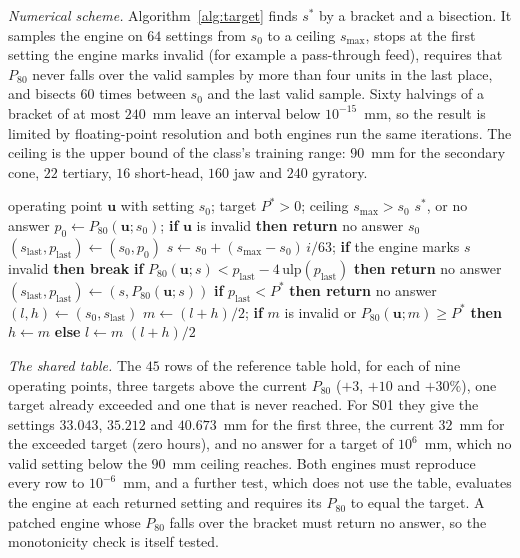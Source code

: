 \emph{Numerical scheme.} Algorithm~\ref{alg:target} finds $s^{\ast}$ by a bracket and a bisection. It samples the engine on $64$ settings from $s_0$
to a ceiling $s_{\max}$, stops at the first setting the engine marks invalid (for example a pass-through feed), requires that $P_{80}$ never falls
over the valid samples by more than four units in the last place, and bisects $60$ times between $s_0$ and the last valid sample. Sixty halvings of a
bracket of at most $240$~mm leave an interval below $10^{-15}$~mm, so the result is limited by floating-point resolution and both engines run the
same iterations. The ceiling is the upper bound of the class's training range: $90$~mm for the secondary cone, $22$ tertiary, $16$ short-head, $160$
jaw and $240$ gyratory.

\begin{algorithm}[!t]
\caption{The setting at which the engine's $P_{80}$ reaches a target (\texttt{css\_at\_p80\_target}).}
\label{alg:target}
\begin{algorithmic}[1]
\Require operating point $\mathbf u$ with setting $s_0$; target $P^{\ast}>0$; ceiling $s_{\max}>s_0$
\Ensure $s^{\ast}$, or no answer
\State $p_0\gets P_{80}(\mathbf u;s_0)$; \textbf{if} $\mathbf u$ is invalid \textbf{then return} no answer
 \Return $s_0$ 
\EndIf
\State $(s_{\mathrm{last}}, p_{\mathrm{last}})\gets(s_0,p_0)$
  \State $s\gets s_0+(s_{\max}-s_0)\,i/63$; \textbf{if} the engine marks $s$ invalid \textbf{then break}
  \State \textbf{if} $P_{80}(\mathbf u;s)<p_{\mathrm{last}}-4\,\mathrm{ulp}(p_{\mathrm{last}})$ \textbf{then return} no answer 
  \State $(s_{\mathrm{last}}, p_{\mathrm{last}})\gets(s, P_{80}(\mathbf u;s))$
\EndFor
\State \textbf{if} $p_{\mathrm{last}}<P^{\ast}$ \textbf{then return} no answer 
\State $(l,h)\gets(s_0,s_{\mathrm{last}})$
  \State $m\gets(l+h)/2$; \textbf{if} $m$ is invalid or $P_{80}(\mathbf u;m)\ge P^{\ast}$ \textbf{then} $h\gets m$ \textbf{else} $l\gets m$
\EndFor
\State \Return $(l+h)/2$
\end{algorithmic}
\end{algorithm}

\emph{The shared table.} The $45$ rows of the reference table hold, for each of nine operating points, three targets above the current
$P_{80}$ ($+3$, $+10$ and $+30\%$), one target already exceeded and one that is never reached. For S01 they give the settings $33.043$, $35.212$ and
$40.673$~mm for the first three, the current $32$~mm for the exceeded target (zero hours), and no answer for a target of $10^{6}$~mm, which no valid
setting below the $90$~mm ceiling reaches. Both engines must reproduce every row to $10^{-6}$~mm, and a further test, which does not use the table,
evaluates the engine at each returned setting and requires its $P_{80}$ to equal the target. A patched engine whose $P_{80}$ falls over the bracket
must return no answer, so the monotonicity check is itself tested.


